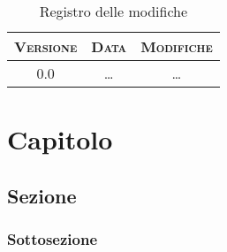\documentclass[10pt,a4paper,headinclude,hidelinks,draft]{scrreprt} %
\begin{document}
    \title{\rmfamily\normalfont{}}
    \author{}
    \date{\today}
    
    \maketitle
    
    \begin{abstract}
        \noindent Breve descrizione del documento.
    \end{abstract}
    
	\begin{table}[ht]
	\centering
	\begin{tabular}{|c|c|c|}
	\hline
	\textsc{Versione} & \textsc{Data} & \textsc{Modifiche} \\ \hline
	0.0 & \ldots & \ldots \\ \hline
	\end{tabular}
	\caption{Registro delle modifiche}
	\label{tab:stage:wp:workload}
	\end{table}

	\tableofcontents
	\listoffigures
	\begingroup
	\let\clearpage\relax
	\listoftables
	\endgroup

	\chapter{Capitolo}
	\section{Sezione}
	\subsection{Sottosezione}
\end{document}

